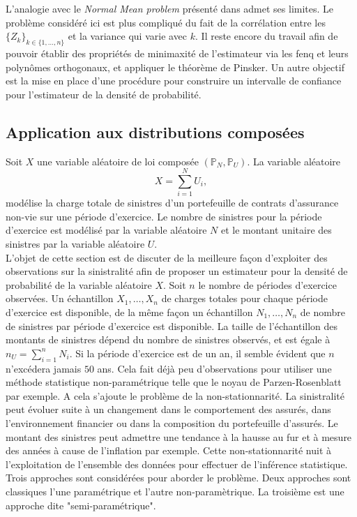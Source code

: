 L'analogie avec le \textit{Normal Mean problem} présenté dans \cite{Wa06} admet ses limites. Le problème considéré ici est plus compliqué du fait de la corrélation entre les $\{Z_{k}\}_{k\in\{1,\ldots,n\}}$ et la variance qui varie avec $k$. Il reste encore du travail afin de pouvoir établir des propriétés de minimaxité de l\rq{}estimateur via les \gls{fenq} et leurs polynômes orthogonaux, et appliquer le théorème de Pinsker. Un autre objectif est la mise en place d\rq{}une procédure pour construire un intervalle de confiance pour l\rq{}estimateur de la densité de probabilité.
\subsection{Application aux distributions composées}
Soit $X$ une variable aléatoire de loi composée $(\mathbb{P}_{N},\mathbb{P}_{U})$. La variable aléatoire 
\begin{equation}\label{CompoundDistribution}
X=\sum_{i=1}^{N}U_{i},
\end{equation}
modélise la charge totale de sinistres d'un portefeuille de contrats d'assurance non-vie sur une période d'exercice. Le nombre de sinistres pour la période d'exercice est modélisé par la variable aléatoire $N$ et le montant unitaire des sinistres par la variable aléatoire $U$.\\

L'objet de cette section est de discuter de la meilleure façon d'exploiter des observations sur la sinistralité afin de proposer un estimateur pour la densité de probabilité de la variable aléatoire $X$. Soit $n$ le nombre de périodes d'exercice observées. Un échantillon $X_{1},\ldots,X_{n}$ de charges totales pour chaque période d'exercice est disponible, de la même façon un échantillon $N_{1},\ldots,N_{n}$ de nombre de sinistres par période d'exercice est disponible. La taille de l'échantillon des montants de sinistres dépend du nombre de sinistres observés, et est égale à $n_{U}=\sum_{i=1}^{n}N_{i}$. Si la période d'exercice est de un an, il semble évident que $n$ n'excédera jamais $50$ ans. Cela fait déjà peu d'observations pour utiliser une méthode statistique non-paramétrique telle que le noyau de Parzen-Rosenblatt par exemple. A cela s'ajoute le problème de la non-stationnarité. La sinistralité peut évoluer suite à un changement dans le comportement des assurés, dans l'environnement financier ou dans la composition du portefeuille d'assurés. Le montant des sinistres peut admettre une tendance à la hausse au fur et à mesure des années à cause de l'inflation par exemple. Cette non-stationnarité nuit à l'exploitation de l'ensemble des données pour effectuer de l'inférence statistique. Trois approches sont considérées pour aborder le problème. Deux approches sont classiques l'une paramétrique et l'autre non-paramètrique. La troisième est une approche dite "semi-paramétrique". 

